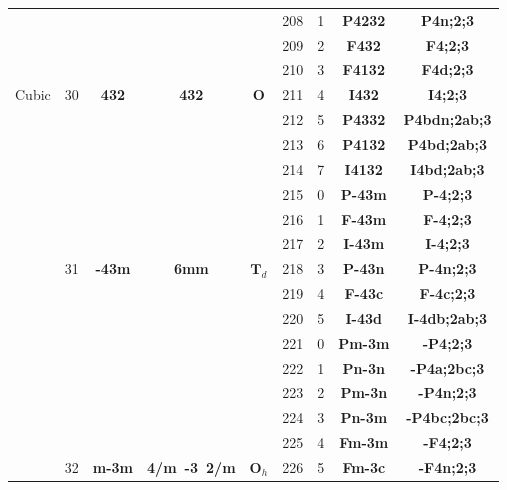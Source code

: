 \documentclass{article}      %
\begin{document}
\begin{small}
\begin{longtable}[c]{|c|c|c|c|c|c|c|c|c|}
 & & & & &\textrm{208} &1 &\textbf{P4232} &\textbf{P4n;2;3} \\\cline{6-9}
 & & & & &\textrm{209} &2 &\textbf{F432} &\textbf{F4;2;3} \\\cline{6-9}
 & & & & &\textrm{210} &3 &\textbf{F4132} &\textbf{F4d;2;3} \\\cline{6-9}
 \textrm{Cubic} & \textrm{30} &\textbf{432} &\textbf{432} &$\mathbf{O}$ &\textrm{211} &4 &\textbf{I432}&\textbf{I4;2;3} \\\cline{6-9}
 & & & & &\textrm{212} &5 &\textbf{P4332} &\textbf{P4bdn;2ab;3} \\\cline{6-9}
 & & & & &\textrm{213} &6 &\textbf{P4132} &\textbf{P4bd;2ab;3} \\\cline{6-9}
 & & & & &\textrm{214} &7 &\textbf{I4132} &\textbf{I4bd;2ab;3} \\\cline{2-9}
 & & & & &\textrm{215} &0 &\textbf{P-43m} &\textbf{P-4;2;3} \\\cline{6-9}
 & & & & &\textrm{216} &1 &\textbf{F-43m} &\textbf{F-4;2;3} \\\cline{6-9}
 & & & & &\textrm{217} &2 &\textbf{I-43m} &\textbf{I-4;2;3} \\\cline{6-9}
 & \textrm{31} &\textbf{-43m} &\textbf{6mm} &$\mathbf{T}_{d}$ &\textrm{218} &3 &\textbf{P-43n}&\textbf{P-4n;2;3} \\\cline{6-9}
 & & & & &\textrm{219} &4 &\textbf{F-43c}&\textbf{F-4c;2;3} \\\cline{6-9}
 & & & & &\textrm{220} &5 &\textbf{I-43d}&\textbf{I-4db;2ab;3} \\\cline{2-9}
 & & & & &\textrm{221} & 0&\textbf{Pm-3m}&\textbf{-P4;2;3} \\\cline{6-9}
 & & & & &\textrm{222} & 1&\textbf{Pn-3n}&\textbf{-P4a;2bc;3} \\\cline{6-9}
 & & & & &\textrm{223} & 2&\textbf{Pm-3n}&\textbf{-P4n;2;3} \\\cline{6-9}
 & & & & &\textrm{224} & 3&\textbf{Pn-3m}&\textbf{-P4bc;2bc;3} \\\cline{6-9}
 & & & & &\textrm{225} & 4&\textbf{Fm-3m}&\textbf{-F4;2;3} \\\cline{6-9}
 & \textrm{32} &\textbf{m-3m} &\textbf{4/m~-3~2/m} &$\mathbf{O}_{h}$ &\textrm{226} & 5&\textbf{Fm-3c}&\textbf{-F4n;2;3} \\\cline{6-9}

\end{longtable}
\end{small}
\end{document}
